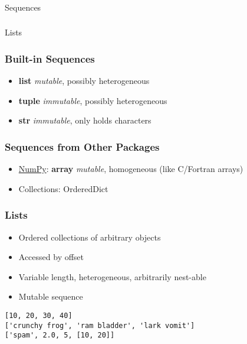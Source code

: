 \begin{frame}[fragile]\frametitle{}
\begin{center}
{\Large Sequences}
\end{center}
\end{frame}

\begin{frame}[fragile]\frametitle{}
\begin{center}
{\Large Lists}
\end{center}
\end{frame}

\begin{frame}[fragile]\frametitle{Built-in Sequences}

  \begin{itemize}
  \item {\bf list} \emph{mutable}, possibly heterogeneous
  \item{\bf tuple} \emph{immutable}, possibly heterogeneous
  \item{\bf str} \emph{immutable}, only holds characters
  \end{itemize}
\end{frame}


\begin{frame}[fragile]\frametitle{Sequences from Other Packages}
  \begin{itemize}
  \item \href{http://numpy.scipy.org}{NumPy}: {\bf array} \emph{mutable}, homogeneous (like C/Fortran arrays)
  \item Collections: OrderedDict
  \end{itemize}
\end{frame}

\begin{frame}[fragile]\frametitle{Lists}
  \begin{itemize}
  \item Ordered collections of arbitrary objects
  \item Accessed by offset
  \item Variable length, heterogeneous, arbitrarily nest-able
  \item Mutable sequence
  \end{itemize}
  \begin{lstlisting}
[10, 20, 30, 40]
['crunchy frog', 'ram bladder', 'lark vomit']
['spam', 2.0, 5, [10, 20]]
\end{lstlisting}
\end{frame}

